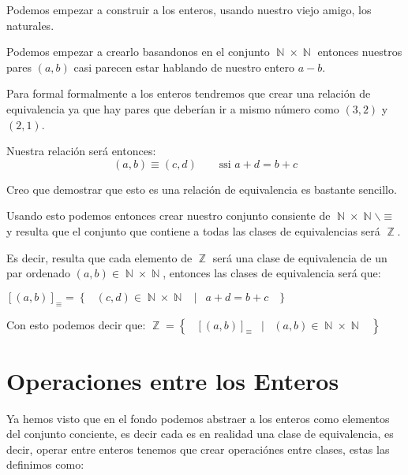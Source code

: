 \documentclass[12pt, fleqn]{report}                             %
\newcommand \Quote {\qq}                                        %
\DeclareMathOperator \Space {\quad}                             %
\DeclareMathOperator \MiniSpace {\;}                            %
\newcommand \Such {\MiniSpace|\MiniSpace}                       %
\newcommand{\Set}[1]{\left\{ \MiniSpace #1 \MiniSpace \right\}} %
\DeclareMathOperator \Naturals  {\mathbb{N}}                     %
\DeclareMathOperator \Integers  {\mathbb{Z}}                     %
\begin{document}
        Podemos empezar a construir a los enteros, usando nuestro viejo amigo, los 
        naturales.

        Podemos empezar a crearlo basandonos en el conjunto $\Naturals \times \Naturals$
        entonces nuestros pares $(a, b)$ casi parecen estar hablando de nuestro entero 
        $a-b$.

        Para formal formalmente a los enteros tendremos que crear una relación de equivalencia
        ya que hay pares que deberían ir a mismo número como $(3,2)$ y $(2,1)$.

        Nuestra relación será entonces:
        \begin{equation}
            (a,b) \equiv (c,d) \Space \text{ ssi } a + d = b + c
        \end{equation}

        Creo que demostrar que esto es una relación de equivalencia es bastante sencillo.

        Usando esto podemos entonces crear nuestro conjunto consiente de
        $\Naturals \times \Naturals \backslash \equiv$ y resulta que el conjunto que contiene
        a todas las clases de equivalencias será $\Integers$.

        Es decir, resulta que cada elemento de $\Integers$ será una clase de equivalencia
        de un par ordenado $(a,b) \in \Naturals \times \Naturals$, entonces
        las clases de equivalencia será que:

        $[(a,b)]_{\equiv} = \Set{(c,d) \in \Naturals \times \Naturals \Such a+d=b+c}$

        Con esto podemos decir que:
        $\Integers = \Set{ [(a,b)]_{\equiv} \Such (a,b) \in \Naturals \times \Naturals}$


        \section{Operaciones entre los Enteros}

            Ya hemos visto que en el fondo podemos abstraer a los enteros como elementos del
            conjunto conciente, es decir cada \Quote{número entero} es en realidad una clase
            de equivalencia, es decir, operar entre enteros tenemos que crear operaciónes entre
            clases, estas las definimos como:
\end{document}
